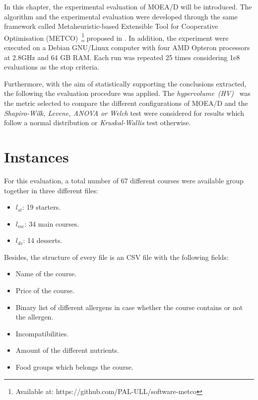 
In this chapter, the experimental evaluation of MOEA/D will be introduced. %
The algorithm and the experimental evaluation were developed through the same framework called Metaheuristic-based Extensible Tool for Cooperative Optimisation (METCO)~\footnote{Available at: https://github.com/PAL-ULL/software-metco} proposed in \cite{METCO}.
In addition, the experiment were executed on a Debian GNU/Linux computer with four AMD Opteron processors at 2.8GHz and 64 GB RAM. Each run was repeated 25 times considering 1e8 evaluations as the stop criteria.

Furthermore, with the aim of statistically supporting the conclusions extracted, the following the evaluation procedure was applied. The \textit{hypervolume~(HV)}~\cite{HYPER} was the metric selected to compare the different configurations of MOEA/D and the \textit{Shapiro-Wilk, Levene, ANOVA or Welch} test were considered for results which follow a normal distribution or \textit{Kruskal-Wallis} test otherwise. 
\section{Instances}
For this evaluation, a total number of 67 different courses were available group together in three different files:
\begin{itemize}
    \item $l_{st}$: 19 starters.
    \item $l_{mc}$: 34 main courses.
    \item $l_{ds}$: 14 desserts.
\end{itemize}
Besides, the structure of every file is an CSV file with the following fields:
\begin{itemize}
    \item Name of the course.
    \item Price of the course.
    \item Binary list of different allergens in case whether the course contains or not the allergen.
    \item Incompatibilities.
    \item Amount of the different nutrients.
    \item Food groups which belongs the course.
\end{itemize}
